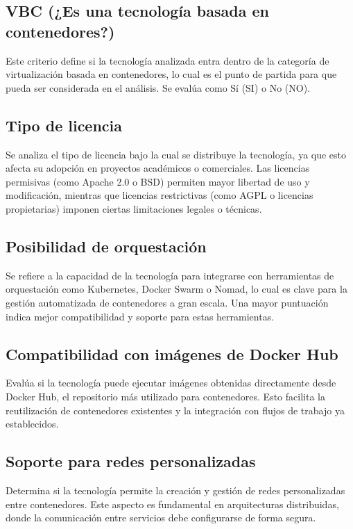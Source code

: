 \subsection{VBC (¿Es una tecnología basada en contenedores?)}
Este criterio define si la tecnología analizada entra dentro de la categoría de virtualización basada en contenedores, lo cual es el punto de partida para que pueda ser considerada en el análisis. Se evalúa como Sí (SI) o No (NO).

\subsection{Tipo de licencia}
Se analiza el tipo de licencia bajo la cual se distribuye la tecnología, ya que esto afecta su adopción en proyectos académicos o comerciales. Las licencias permisivas (como Apache 2.0 o BSD) permiten mayor libertad de uso y modificación, mientras que licencias restrictivas (como AGPL o licencias propietarias) imponen ciertas limitaciones legales o técnicas.

\subsection{Posibilidad de orquestación}
Se refiere a la capacidad de la tecnología para integrarse con herramientas de orquestación como Kubernetes, Docker Swarm o Nomad, lo cual es clave para la gestión automatizada de contenedores a gran escala. Una mayor puntuación indica mejor compatibilidad y soporte para estas herramientas.

\subsection{Compatibilidad con imágenes de Docker Hub}
Evalúa si la tecnología puede ejecutar imágenes obtenidas directamente desde Docker Hub, el repositorio más utilizado para contenedores. Esto facilita la reutilización de contenedores existentes y la integración con flujos de trabajo ya establecidos.

\subsection{Soporte para redes personalizadas}
Determina si la tecnología permite la creación y gestión de redes personalizadas entre contenedores. Este aspecto es fundamental en arquitecturas distribuidas, donde la comunicación entre servicios debe configurarse de forma segura.

